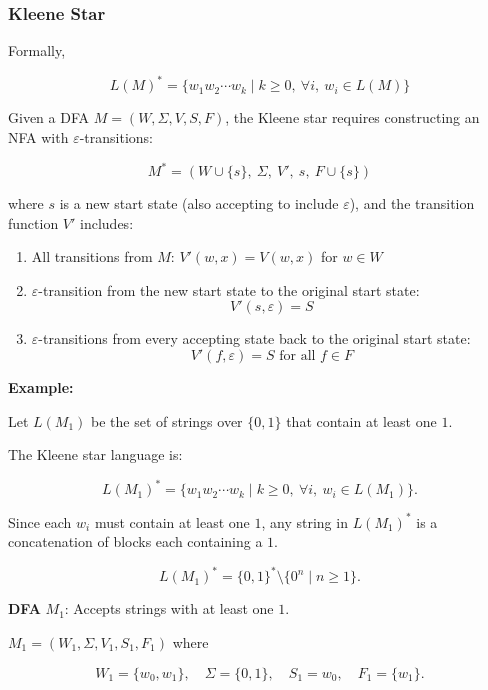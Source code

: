 \documentclass[12pt,a4paper,openany]{article}
\begin{document}
\subsubsection{Kleene Star}

Formally,

\[L(M)^* = \{ w_1 w_2 \cdots w_k \mid k \ge 0,\ \forall i,\ w_i \in L(M) \}\]

Given a DFA $M = (W, \Sigma, V, S, F)$, the Kleene star requires constructing an NFA with $\varepsilon$-transitions:

\[M^* = (W \cup \{s\},\ \Sigma,\ V',\ s,\ F \cup \{s\})\]

where $s$ is a new start state (also accepting to include $\varepsilon$), and the transition function $V'$ includes:

\begin{enumerate}
    \item All transitions from $M$: $V'(w, x) = V(w, x)$ for $w \in W$
    \item $\varepsilon$-transition from the new start state to the original start state:
    \[V'(s, \varepsilon) = S\]
    \item $\varepsilon$-transitions from every accepting state back to the original start state:
    \[V'(f, \varepsilon) = S \text{ for all } f \in F\]
\end{enumerate}

\textbf{Example:}

Let $L(M_1)$ be the set of strings over $\{0,1\}$ that contain at least one $1$.

The Kleene star language is:

\[
L(M_1)^* = \{ w_1 w_2 \cdots w_k \mid k \ge 0,\ \forall i,\ w_i \in L(M_1) \}.
\]

Since each $w_i$ must contain at least one $1$, any string in $L(M_1)^*$ is a concatenation of blocks each containing a $1$.

\[
L(M_1)^* = \{0,1\}^* \setminus \{0^n \mid n \ge 1\}.
\]

\textbf{DFA} $M_1$: Accepts strings with at least one $1$.

$M_1 = (W_1,\Sigma,V_1,S_1,F_1)$ where

\[
W_1 = \{w_0,w_1\}, \quad
\Sigma = \{0,1\}, \quad
S_1 = w_0, \quad
F_1 = \{w_1\}.
\]

\begin{center}
\end{center}
\end{document}
